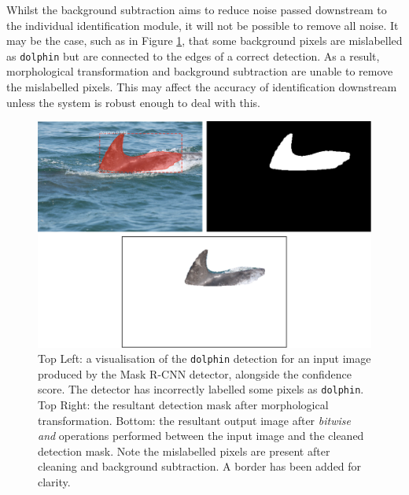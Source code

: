 Whilst the background subtraction aims to reduce noise passed downstream to the individual identification module, it will not be possible to remove all noise. It may be the case, such as in Figure \ref{fig:fin-extraction-unclean}, that some background pixels are mislabelled as \texttt{dolphin} but are connected to the edges of a correct detection. As a result, morphological transformation and background subtraction are unable to remove the mislabelled pixels. This may affect the accuracy of identification downstream unless the system is robust enough to deal with this.

\begin{figure}
	\begin{center}
		\includegraphics[scale=0.5]{Chapter3/figs/fin-extraction-unclean-uncropped.png}
	\end{center}
	\caption[Top Left: a visualisation of the \texttt{dolphin} detection for an input image produced by the Mask R-CNN detector, alongside the confidence score. Top Right: the resultant detection mask after morphological transformation. Bottom: the resultant output image after \textit{bitwise and} operations performed between the input image and the cleaned detection mask.]{Top Left: a visualisation of the \texttt{dolphin} detection for an input image produced by the Mask R-CNN detector, alongside the confidence score. The detector has incorrectly labelled some pixels as \texttt{dolphin}. Top Right: the resultant detection mask after morphological transformation. Bottom: the resultant output image after \textit{bitwise and} operations performed between the input image and the cleaned detection mask. Note the mislabelled pixels are present after cleaning and background subtraction. A border has been added for clarity.}
	\label{fig:fin-extraction-unclean}
\end{figure}

